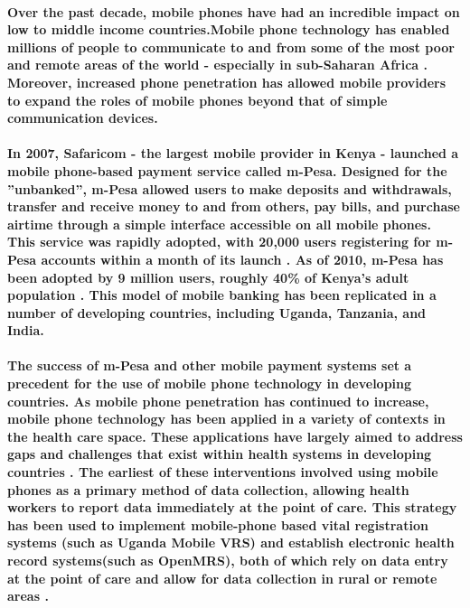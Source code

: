 \paragraph{Over the past decade, mobile phones have had an incredible impact on low to middle income countries.Mobile phone technology has enabled millions of people to communicate to and from some of the most poor and remote areas of the world - especially in sub-Saharan Africa \citep{Adler2007}. Moreover, increased phone penetration has allowed mobile providers to expand the roles of mobile phones  beyond that of simple communication devices.}

\paragraph{In 2007, Safaricom - the largest mobile provider in Kenya - launched a mobile phone-based payment service called m-Pesa. Designed for the ''unbanked'', m-Pesa allowed users to make deposits and withdrawals, transfer and receive money to and from others, pay bills, and purchase airtime through a simple interface accessible on all mobile phones. This service was rapidly adopted, with 20,000 users registering for m-Pesa accounts within a month of its launch \citep{Hughes2007}. As of 2010, m-Pesa has been adopted by 9 million users, roughly 40\% of Kenya's adult population \citep{Mas2010}. This model of mobile banking has been replicated in a number of developing countries, including Uganda, Tanzania, and India.}

\paragraph{The success of m-Pesa and other mobile payment systems set a precedent for the use of mobile phone technology in developing countries. As mobile phone penetration has continued to increase, mobile phone technology has been applied in a variety of contexts in the health care space. These applications have largely aimed to address gaps and challenges that exist within health systems in developing countries \citep{Labrique2013}. The earliest of these interventions involved using mobile phones as a primary method of data collection, allowing health workers to report data immediately at the point of care. This strategy has been used to implement mobile-phone based vital registration systems (such as Uganda Mobile VRS) and establish electronic health record systems(such as OpenMRS), both of which rely on data entry at the point of care and allow for data collection in rural or remote areas \citep{Labrique2013}.}

